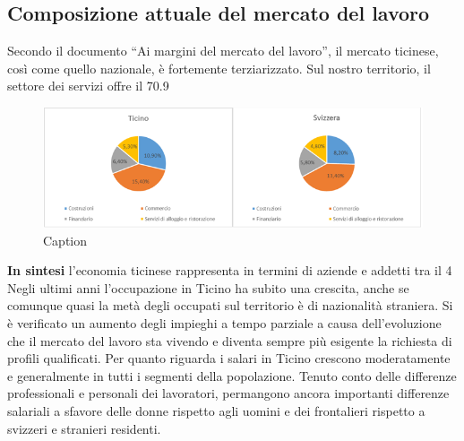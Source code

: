 \subsection{Composizione attuale del mercato del lavoro}
Secondo il documento “Ai margini del mercato del lavoro”, il mercato ticinese, così come quello nazionale, è fortemente terziarizzato. Sul nostro territorio, il settore dei servizi offre il 70.9%
\begin{figure}
    \centering
    \includegraphics{Grafico settore terziario.PNG}
    \caption{Caption}
    \label{Composizione settore terziario in Ticino e Svizzera}
\end{figure}
\textbf{In sintesi} l’economia ticinese rappresenta in termini di aziende e addetti tra il 4%
Negli ultimi anni l’occupazione in Ticino ha subito una crescita, anche se comunque quasi la metà degli occupati sul territorio è di nazionalità straniera. Si è verificato un aumento degli impieghi a tempo parziale a causa dell’evoluzione che il mercato del lavoro sta vivendo e diventa sempre più esigente la richiesta di profili qualificati.
Per quanto riguarda i salari in Ticino crescono moderatamente e generalmente in tutti i segmenti della popolazione. Tenuto conto delle differenze professionali e personali dei lavoratori, permangono ancora importanti differenze salariali a sfavore delle donne rispetto agli uomini e dei frontalieri rispetto a svizzeri e stranieri residenti.

